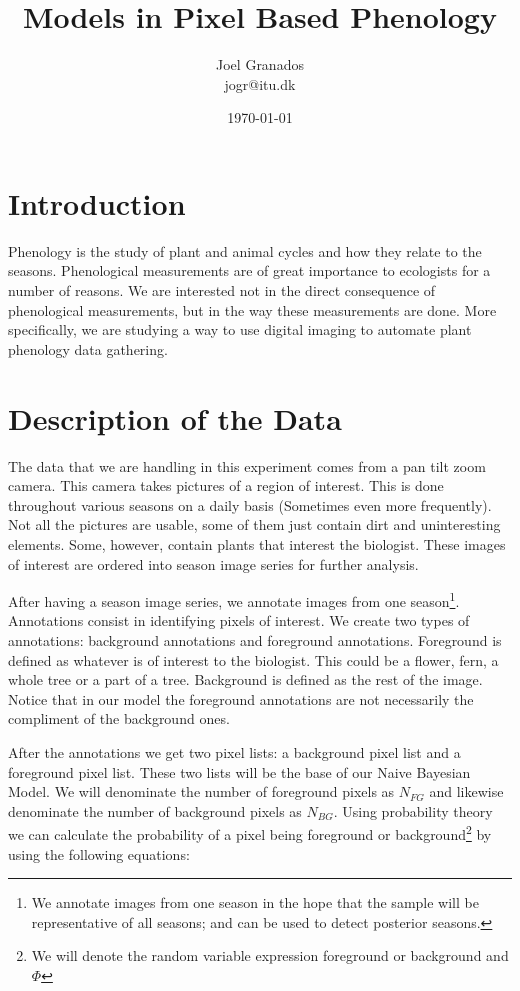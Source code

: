 \documentclass[a4paper,12pt]{report}
\begin{document}
\title{Models in Pixel Based Phenology}
\author{Joel Granados \\ jogr@itu.dk}
\date{ \today }

\maketitle

\section*{Introduction}
Phenology is the study of plant and animal cycles and how they relate to the
seasons. Phenological measurements are of great importance to ecologists for a
number of reasons. We are interested not in the direct consequence of
phenological measurements, but in the way these measurements are done. More
specifically, we are studying a way to use digital imaging to automate plant
phenology data gathering.

\section{Description of the Data}
The data that we are handling in this experiment comes from a pan tilt zoom
camera. This camera takes pictures of a region of interest. This is done
throughout various seasons on a daily basis (Sometimes even more frequently).
Not all the pictures are usable, some of them just contain dirt and
uninteresting elements. Some, however, contain plants that interest the
biologist. These images of interest are ordered into season image series for
further analysis.

After having a season image series, we annotate images from one
season\footnote{We annotate images from one season in the hope that the
sample will be representative of all seasons; and can be used to detect
posterior seasons.}. Annotations consist in identifying pixels of interest.
We create two types of annotations: background annotations and foreground
annotations. Foreground is defined as whatever is of interest to
the biologist. This could be a flower, fern, a whole tree or a part of a tree.
Background is defined as the rest of the image. Notice that in our model the
foreground annotations are not necessarily the compliment of the background
ones.

After the annotations we get two pixel lists: a background pixel list and a
foreground pixel list. These two lists will be the base of our Naive Bayesian
Model. We will denominate the number of foreground pixels as $N_{FG}$ and
likewise denominate the number of background pixels as $N_{BG}$. Using probability
theory %
we can calculate
the probability of a pixel being foreground or background\footnote{We will
denote the random variable expression foreground or background and $\Phi$}
by using the following equations:
\end{document}
